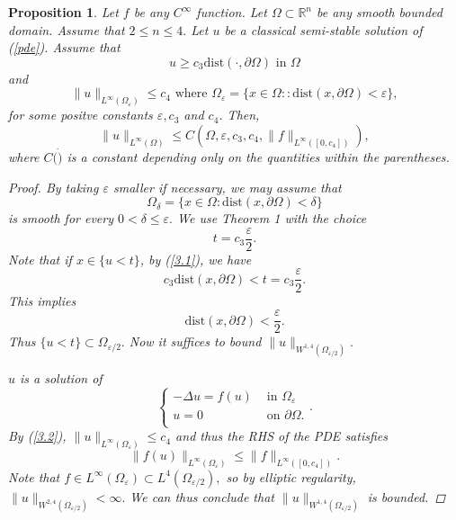 \documentclass[paper=a4, fontsize=11pt]{scrartcl} %
\numberwithin{equation}{section} %
\numberwithin{figure}{section} %
\numberwithin{table}{section} %
\newtheorem{proposition}{Proposition}
\numberwithin{exercise}{section}
\begin{document}
\begin{proposition}
Let $f$ be any $C^\infty$ function. Let $\Omega\subset \mathbb{R}^n$ be any smooth bounded domain. Assume that $2\leq n\leq 4.$
Let $u$ be a classical semi-stable solution of (\ref{pde}). Assume that 
\begin{equation}\label{3.1}
u\geq c_3\mathrm{dist}(\cdot,\partial\Omega) \mbox{ in } \Omega
\end{equation}
and 
\begin{equation}\label{3.2}
\|u\|_{L^{\infty} (\Omega_{\varepsilon})}\leq c_4 \mbox{ where } \Omega_{\varepsilon}=\{x\in\Omega \colon :\mathrm{dist}(x,\partial \Omega)<\varepsilon\},
\end{equation}
for some positve constants $\varepsilon, c_3$ and $c_4$. Then,
\begin{equation}\label{3.3}
\|u\|_{L^{\infty}(\Omega)}\leq C(\Omega,\varepsilon,c_3,c_4,\|f\|_{L^{\infty}([0,c_4])}),
\end{equation}
where $C(\dot)$ is a constant depending only on the quantities within the parentheses.
\begin{proof}
By taking $\varepsilon $ smaller if necessary, we may assume that 
$$\Omega_{\delta}=\{x\in\Omega \colon \mathrm{dist}(x,\partial \Omega)<\delta \}$$ is smooth for every $0<\delta\leq \varepsilon.$ We use Theorem 1 with  the choice 
$$t=c_3\frac{\varepsilon}{2}.$$
Note that if $x\in \{ u<t\}$,  by (\ref{3.1}), we have 
$$c_3\mathrm{dist}(x,\partial \Omega) <t =c_3 \frac{\varepsilon}{2}.$$
This implies $$\mathrm{dist}(x,\partial\Omega) <\frac{\varepsilon}{2}.$$
Thus $\{u<t\}\subset \Omega_{\varepsilon/2}.$
Now it suffices to bound $\|u\|_{W^{1,4} \left(\Omega_{\varepsilon/2}\right)}.$

$u$ is a solution of 
$$\begin{cases} -\Delta u =f(u) &\mbox{ in } \Omega_{\varepsilon} \\
 u=0&  \mbox{ on } \partial\Omega.\\
 \end{cases}.$$
 By (\ref{3.2}), $\|u\|_{L^\infty(\Omega_{\varepsilon})} \leq c_4$ and thus the RHS of the PDE satisfies $$\|f(u)\|_{L^\infty (\Omega_{\varepsilon})} \leq \|f\|_{L^\infty( [0, c_4])}.$$
 Note that $f\in L^\infty(\Omega_{\varepsilon} )\subset L^4(\Omega_{\varepsilon/2}),$
 so by elliptic regularity, $\|u\|_{W^{2,4}(\Omega_{\varepsilon/2})}<\infty.$ We can thus conclude that $\|u\|_{W^{1,4}(\Omega_{\varepsilon/2})}$ is bounded.
 \end{proof}
\end{proposition}
\end{document}
